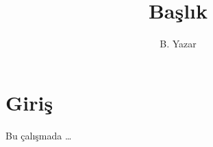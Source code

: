 \documentclass{article}
\title{Başlık}
\author{B. Yazar}
\begin{document}
\maketitle

\section{Giriş}

Bu çalışmada \ldots
\end{document}
